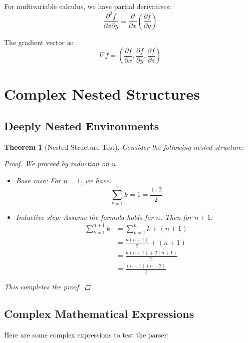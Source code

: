 \documentclass[12pt]{article}
\newtheorem{theorem}{Theorem}
\begin{document}
For multivariable calculus, we have partial derivatives:
\begin{equation}
\frac{\partial^2 f}{\partial x \partial y} = \frac{\partial}{\partial x}\left(\frac{\partial f}{\partial y}\right)
\end{equation}

The gradient vector is:
\begin{equation}
\nabla f = \left(\frac{\partial f}{\partial x}, \frac{\partial f}{\partial y}, \frac{\partial f}{\partial z}\right)
\end{equation}

\section{Complex Nested Structures}

\subsection{Deeply Nested Environments}

\begin{theorem}[Nested Structure Test]
Consider the following nested structure:
\begin{proof}
We proceed by induction on $n$.
\begin{itemize}
\item Base case: For $n = 1$, we have:
\begin{equation}
\sum_{k=1}^{1} k = 1 = \frac{1 \cdot 2}{2}
\end{equation}
\item Inductive step: Assume the formula holds for $n$. Then for $n+1$:
\begin{align}
\sum_{k=1}^{n+1} k &= \sum_{k=1}^{n} k + (n+1) \\
&= \frac{n(n+1)}{2} + (n+1) \\
&= \frac{n(n+1) + 2(n+1)}{2} \\
&= \frac{(n+1)(n+2)}{2}
\end{align}
\end{itemize}
This completes the proof.
\end{proof}
\end{theorem}

\subsection{Complex Mathematical Expressions}

Here are some complex expressions to test the parser:
\end{document}
